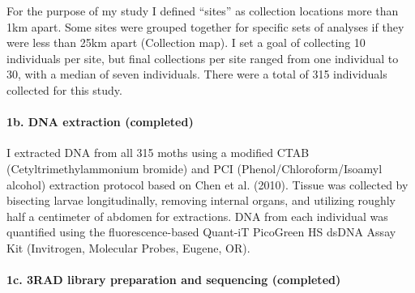 For the purpose of my study I defined ``sites'' as collection locations
more than 1km apart. Some sites were grouped together for specific sets
of analyses if they were less than 25km apart (Collection map). I set a
goal of collecting 10 individuals per site, but final collections per
site ranged from one individual to 30, with a median of seven
individuals. There were a total of 315 individuals collected for this
study.

\paragraph{1b. DNA extraction
(completed)}\label{b.-dna-extraction-completed}

I extracted DNA from all 315 moths using a modified CTAB
(Cetyltrimethylammonium bromide) and PCI (Phenol/Chloroform/Isoamyl
alcohol) extraction protocol based on Chen et al. (2010). Tissue was
collected by bisecting larvae longitudinally, removing internal organs,
and utilizing roughly half a centimeter of abdomen for extractions. DNA
from each individual was quantified using the fluorescence-based
Quant-iT PicoGreen HS dsDNA Assay Kit (Invitrogen, Molecular Probes,
Eugene, OR).

\paragraph{1c. 3RAD library preparation and sequencing
(completed)}\label{c.-3rad-library-preparation-and-sequencing-completed}

